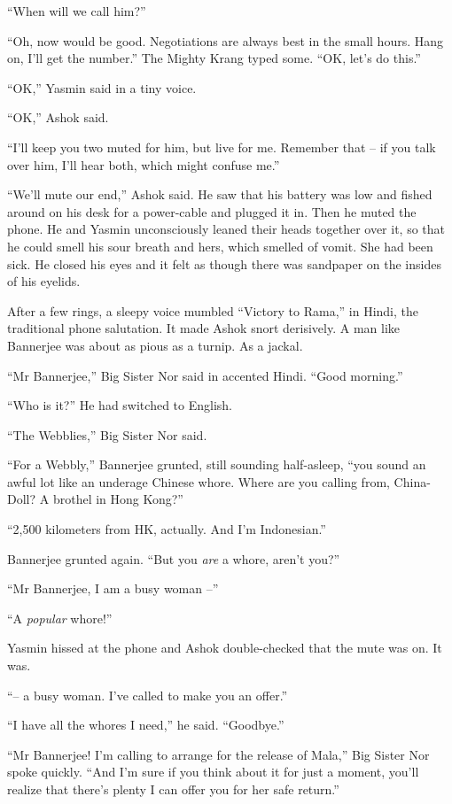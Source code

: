 ``When will we call him?''

``Oh, now would be good. Negotiations are always best in the small
hours. Hang on, I'll get the number.'' The Mighty Krang typed some.
``OK, let's do this.''

``OK,'' Yasmin said in a tiny voice.

``OK,'' Ashok said.

``I'll keep you two muted for him, but live for me. Remember that --
if you talk over him, I'll hear both, which might confuse me.''

``We'll mute our end,'' Ashok said. He saw that his battery was low
and fished around on his desk for a power-cable and plugged it in.
Then he muted the phone. He and Yasmin unconsciously leaned their
heads together over it, so that he could smell his sour breath and
hers, which smelled of vomit. She had been sick. He closed his eyes
and it felt as though there was sandpaper on the insides of his
eyelids.

After a few rings, a sleepy voice mumbled ``Victory to Rama,'' in
Hindi, the traditional phone salutation. It made Ashok snort
derisively. A man like Bannerjee was about as pious as a turnip. As
a jackal.

``Mr Bannerjee,'' Big Sister Nor said in accented Hindi. ``Good
morning.''

``Who is it?'' He had switched to English.

``The Webblies,'' Big Sister Nor said.

``For a Webbly,'' Bannerjee grunted, still sounding half-asleep, ``you
sound an awful lot like an underage Chinese whore. Where are you
calling from, China-Doll? A brothel in Hong Kong?''

``2,500 kilometers from HK, actually. And I'm Indonesian.''

Bannerjee grunted again. ``But you \emph{are} a whore, aren't you?''

``Mr Bannerjee, I am a busy woman --''

``A \emph{popular} whore!''

Yasmin hissed at the phone and Ashok double-checked that the mute
was on. It was.

``-- a busy woman. I've called to make you an offer.''

``I have all the whores I need,'' he said. ``Goodbye.''

``Mr Bannerjee! I'm calling to arrange for the release of Mala,'' Big
Sister Nor spoke quickly. ``And I'm sure if you think about it for
just a moment, you'll realize that there's plenty I can offer you
for her safe return.''

